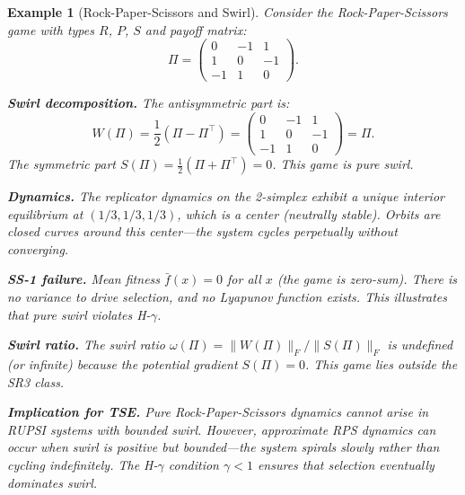 \documentclass[12pt]{article}
\newtheorem{example}[theorem]{Example}
\begin{document}
\begin{example}[Rock-Paper-Scissors and Swirl]
\label{ex:rps}
Consider the Rock-Paper-Scissors game with types $R$, $P$, $S$ and payoff matrix:
\[
\Pi = \begin{pmatrix} 0 & -1 & 1 \\ 1 & 0 & -1 \\ -1 & 1 & 0 \end{pmatrix}.
\]

\textbf{Swirl decomposition.} The antisymmetric part is:
\[
W(\Pi) = \frac{1}{2}(\Pi - \Pi^\top) = \begin{pmatrix} 0 & -1 & 1 \\ 1 & 0 & -1 \\ -1 & 1 & 0 \end{pmatrix} = \Pi.
\]
The symmetric part $S(\Pi) = \frac{1}{2}(\Pi + \Pi^\top) = 0$. This game is pure swirl.

\textbf{Dynamics.} The replicator dynamics on the 2-simplex exhibit a unique interior equilibrium at $(1/3, 1/3, 1/3)$, which is a center (neutrally stable). Orbits are closed curves around this center---the system cycles perpetually without converging.

\textbf{SS-1 failure.} Mean fitness $\bar{f}(x) = 0$ for all $x$ (the game is zero-sum). There is no variance to drive selection, and no Lyapunov function exists. This illustrates that pure swirl violates H-$\gamma$.

\textbf{Swirl ratio.} The swirl ratio $\omega(\Pi) = \|W(\Pi)\|_F / \|S(\Pi)\|_F$ is undefined (or infinite) because the potential gradient $S(\Pi) = 0$. This game lies outside the SR3 class.

\textbf{Implication for TSE.} Pure Rock-Paper-Scissors dynamics cannot arise in RUPSI systems with bounded swirl. However, \emph{approximate} RPS dynamics can occur when swirl is positive but bounded---the system spirals slowly rather than cycling indefinitely. The H-$\gamma$ condition $\gamma < 1$ ensures that selection eventually dominates swirl.
\end{example}
\end{document}
